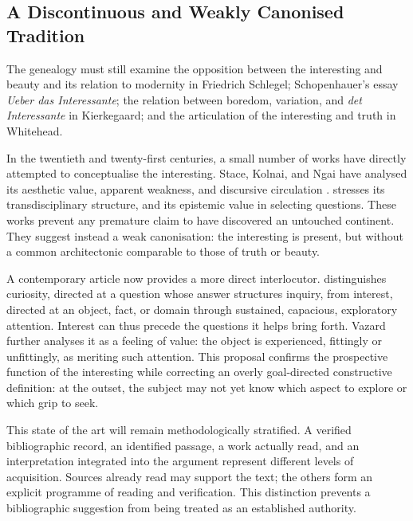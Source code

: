 \documentclass[11pt,a4paper]{article}
\begin{document}
\subsection{A Discontinuous and Weakly Canonised Tradition}

The genealogy must still examine the opposition between the interesting and
beauty and its relation to modernity in Friedrich Schlegel; Schopenhauer's essay
\emph{Ueber das Interessante}; the relation between boredom, variation, and
\emph{det Interessante} in Kierkegaard; and the articulation of the interesting
and truth in Whitehead.

In the twentieth and twenty-first centuries, a small number of works have
directly attempted to conceptualise the interesting. Stace, Kolnai, and Ngai
have analysed its aesthetic value, apparent weakness, and discursive circulation
\parencite{stace1944interestingness,kolnai1964concept,ngai2008merely,ngai2012categories}.
\textcite{epstein2009interesting} stresses its transdisciplinary structure, and
\textcite{grimm2011interesting} its epistemic value in selecting questions.
These works prevent any premature claim to have discovered an untouched
continent. They suggest instead a weak canonisation: the interesting is present,
but without a common architectonic comparable to those of truth or beauty.

A contemporary article now provides a more direct interlocutor.
\textcite{vazard2026inquiry} distinguishes curiosity, directed at a question
whose answer structures inquiry, from interest, directed at an object, fact, or
domain through sustained, capacious, exploratory attention. Interest can thus
precede the questions it helps bring forth. Vazard further analyses it as a
feeling of value: the object is experienced, fittingly or unfittingly, as
meriting such attention. This proposal confirms the prospective function of the
interesting while correcting an overly goal-directed constructive definition:
at the outset, the subject may not yet know which aspect to explore or which
grip to seek.

This state of the art will remain methodologically stratified. A verified
bibliographic record, an identified passage, a work actually read, and an
interpretation integrated into the argument represent different levels of
acquisition. Sources already read may support the text; the others form an
explicit programme of reading and verification. This distinction prevents a
bibliographic suggestion from being treated as an established authority.
\end{document}
